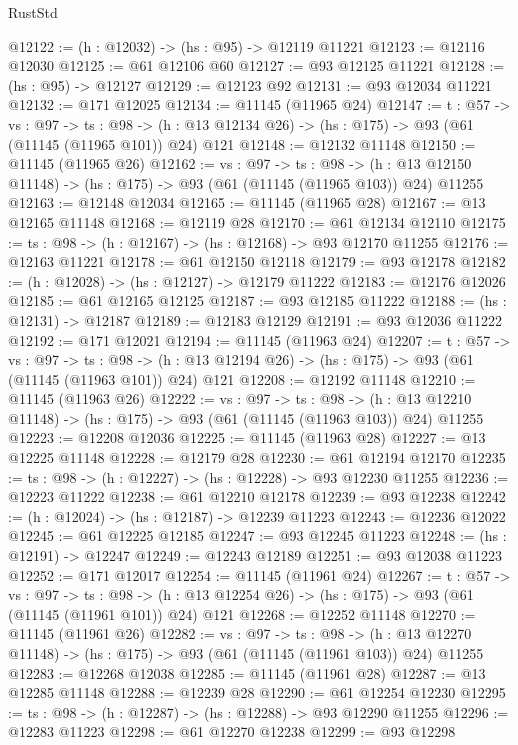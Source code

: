 \begin{lexlean}{RustStd}
\begin{coremodule}
@12122 := (h : @12032) -> (hs : @95) -> @12119 @11221
@12123 := @12116 @12030
@12125 := @61 @12106 @60
@12127 := @93 @12125 @11221
@12128 := (hs : @95) -> @12127
@12129 := @12123 @92
@12131 := @93 @12034 @11221
@12132 := @171 @12025
@12134 := @11145 (@11965 @24)
@12147 := {t : @57} ->
  {vs : @97} ->
  {ts : @98} -> (h : @13 @12134 @26) -> (hs : @175) -> @93 (@61 (@11145 (@11965 @101)) @24) @121
@12148 := @12132 @11148
@12150 := @11145 (@11965 @26)
@12162 := {vs : @97} ->
  {ts : @98} ->
  (h : @13 @12150 @11148) -> (hs : @175) -> @93 (@61 (@11145 (@11965 @103)) @24) @11255
@12163 := @12148 @12034
@12165 := @11145 (@11965 @28)
@12167 := @13 @12165 @11148
@12168 := @12119 @28
@12170 := @61 @12134 @12110
@12175 := {ts : @98} -> (h : @12167) -> (hs : @12168) -> @93 @12170 @11255
@12176 := @12163 @11221
@12178 := @61 @12150 @12118
@12179 := @93 @12178
@12182 := (h : @12028) -> (hs : @12127) -> @12179 @11222
@12183 := @12176 @12026
@12185 := @61 @12165 @12125
@12187 := @93 @12185 @11222
@12188 := (hs : @12131) -> @12187
@12189 := @12183 @12129
@12191 := @93 @12036 @11222
@12192 := @171 @12021
@12194 := @11145 (@11963 @24)
@12207 := {t : @57} ->
  {vs : @97} ->
  {ts : @98} -> (h : @13 @12194 @26) -> (hs : @175) -> @93 (@61 (@11145 (@11963 @101)) @24) @121
@12208 := @12192 @11148
@12210 := @11145 (@11963 @26)
@12222 := {vs : @97} ->
  {ts : @98} ->
  (h : @13 @12210 @11148) -> (hs : @175) -> @93 (@61 (@11145 (@11963 @103)) @24) @11255
@12223 := @12208 @12036
@12225 := @11145 (@11963 @28)
@12227 := @13 @12225 @11148
@12228 := @12179 @28
@12230 := @61 @12194 @12170
@12235 := {ts : @98} -> (h : @12227) -> (hs : @12228) -> @93 @12230 @11255
@12236 := @12223 @11222
@12238 := @61 @12210 @12178
@12239 := @93 @12238
@12242 := (h : @12024) -> (hs : @12187) -> @12239 @11223
@12243 := @12236 @12022
@12245 := @61 @12225 @12185
@12247 := @93 @12245 @11223
@12248 := (hs : @12191) -> @12247
@12249 := @12243 @12189
@12251 := @93 @12038 @11223
@12252 := @171 @12017
@12254 := @11145 (@11961 @24)
@12267 := {t : @57} ->
  {vs : @97} ->
  {ts : @98} -> (h : @13 @12254 @26) -> (hs : @175) -> @93 (@61 (@11145 (@11961 @101)) @24) @121
@12268 := @12252 @11148
@12270 := @11145 (@11961 @26)
@12282 := {vs : @97} ->
  {ts : @98} ->
  (h : @13 @12270 @11148) -> (hs : @175) -> @93 (@61 (@11145 (@11961 @103)) @24) @11255
@12283 := @12268 @12038
@12285 := @11145 (@11961 @28)
@12287 := @13 @12285 @11148
@12288 := @12239 @28
@12290 := @61 @12254 @12230
@12295 := {ts : @98} -> (h : @12287) -> (hs : @12288) -> @93 @12290 @11255
@12296 := @12283 @11223
@12298 := @61 @12270 @12238
@12299 := @93 @12298

\end{coremodule}
\end{lexlean}
